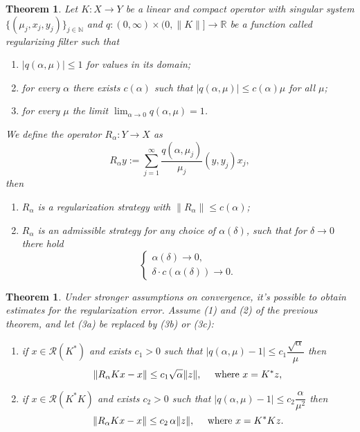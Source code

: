 \documentclass[10pt, a4paper, twoside, openright]{book}
\theoremstyle{definition}
\theoremstyle{plain}
\newtheorem{theorem}[subsection]{Theorem}
\theoremstyle{plain}
\theoremstyle{plain}
\theoremstyle{plain}
\theoremstyle{plain}
\theoremstyle{plain}
\theoremstyle{plain}
\theoremstyle{plain}
\begin{document}
\begin{theorem}
\label{theo:regularization-filter}
 Let $K:X\to Y$ be a linear and compact operator with singular system $\{(\mu_j, x_j, y_j)\}_{j\in\mathbb{N}}$ and
 $q:(0, \infty)\times(0, \|K\|]\to \mathbb{R}$
 be a function called \emph{regularizing filter} such that
 \begin{enumerate}
  \item $|q(\alpha,\mu)|\leq 1$ for values in its domain;
  \item for every $\alpha$ there exists $c(\alpha)$ such that $ |q(\alpha, \mu)| \leq c(\alpha)\mu$ for all $\mu$;
  \item[3a.] for every $\mu$ the limit $ \lim_{\alpha\to0}q(\alpha,\mu) = 1$.
 \end{enumerate}
 We define the operator $R_\alpha:Y\to X$ as
 \begin{equation}
  R_\alpha y:=\sum_{j=1}^\infty \dfrac{q(\alpha,\mu_j)}{\mu_j}(y, y_j)x_j,
 \end{equation}
 then
 \begin{enumerate}
  \item $R_\alpha$ is a regularization strategy with $\|R_\alpha\|\leq c(\alpha)$;
  \item $R_\alpha$ is an admissible strategy for any choice of $\alpha(\delta)$, such that for $\delta\to 0$ there hold
  \begin{equation}
   \left\{
   \begin{aligned}
    \alpha(\delta) \to 0,\\
    \delta \cdot c(\alpha(\delta)) \to 0.
   \end{aligned}
   \right.
  \end{equation}
 \end{enumerate}
\end{theorem}
\begin{theorem}
 Under stronger assumptions on convergence, it's possible to obtain estimates for the regularization error.
 Assume (1) and (2) of the previous theorem, and let (3a) be replaced by (3b) or (3c):
 \begin{enumerate}
  \item[3b.] if $x\in\mathcal{R}(K^*)$ and exists $c_1>0$ such that $|q(\alpha,\mu) - 1|\leq c_1\dfrac{\sqrt{\alpha}}{\mu}$
  then
  \begin{equation}
   \|R_\alpha Kx - x\|\leq c_1\sqrt{\alpha}\|z\|,\quad \textup{ where }x=K^*z,
  \end{equation}
  \item[3c.] if $x\in\mathcal{R}(K^*K)$ and exists $c_2>0$ such that $|q(\alpha,\mu) - 1|\leq c_2\dfrac{\alpha}{\mu^2}$
  then
  \begin{equation}
   \|R_\alpha Kx - x\|\leq c_2\,\alpha\|z\|,\quad \textup{ where }x=K^*Kz.
  \end{equation}
 \end{enumerate}
\end{theorem}
\end{document}
